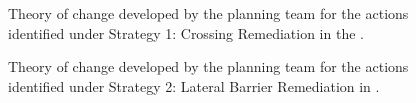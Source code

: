 \documentclass[
  letterpaper,
  DIV=11,
  numbers=noendperiod]{scrreprt}
\begin{document}
\begin{figure}


\caption{\label{fig-stra1}Theory of change developed by the planning
team for the actions identified under Strategy 1: Crossing Remediation
in the .}

\end{figure}%

\begin{figure}


\caption{\label{fig-stra2}Theory of change developed by the planning
team for the actions identified under Strategy 2: Lateral Barrier
Remediation in .}

\end{figure}%
\end{document}
